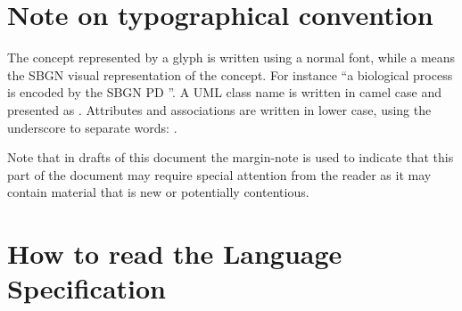 \section{Note on typographical convention}
The concept represented by a glyph is written using a normal font,
while a  means the SBGN visual representation of the
concept. For instance ``a biological process is encoded by the SBGN PD
''. A UML class name is written in camel case and
presented as . Attributes and
associations are written in lower case, using the underscore to
separate words: .

Note that in drafts of this document the margin-note is used to indicate that this part of the document may
require special attention from the reader as it may contain material
that is new or potentially contentious.

\section{How to read the Language Specification}


